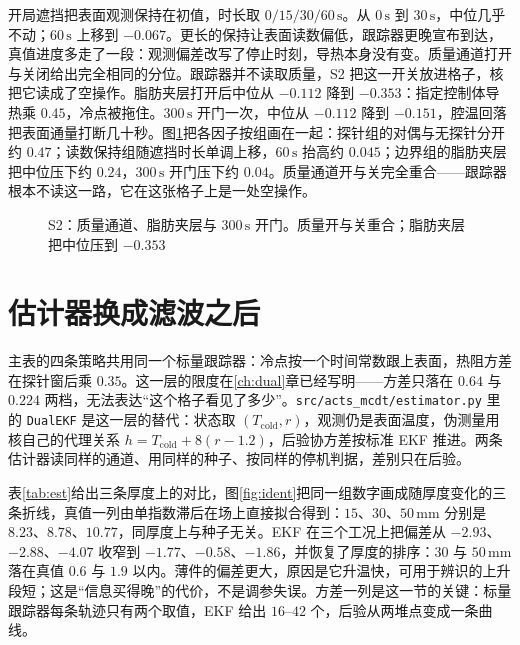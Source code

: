 开局遮挡把表面观测保持在初值，时长取 \(0/15/30/60\,\mathrm{s}\)。从 \(0\,\mathrm{s}\) 到 \(30\,\mathrm{s}\)，中位几乎不动；\(60\,\mathrm{s}\) 上移到 \(-0.067\)。更长的保持让表面读数偏低，跟踪器更晚宣布到达，真值进度多走了一段：观测偏差改写了停止时刻，导热本身没有变。质量通道打开与关闭给出完全相同的分位。跟踪器并不读取质量，S2 把这一开关放进格子，核把它读成了空操作。脂肪夹层打开后中位从 \(-0.112\) 降到 \(-0.353\)：指定控制体导热乘 \(0.45\)，冷点被拖住。\(300\,\mathrm{s}\) 开门一次，中位从 \(-0.112\) 降到 \(-0.151\)，腔温回落把表面通量打断几十秒。图\ref{fig:s2three}{}把各因子按组画在一起：探针组的对偶与无探针分开约 \(0.47\)；读数保持组随遮挡时长单调上移，\(60\,\mathrm{s}\) 抬高约 \(0.045\)；边界组的脂肪夹层把中位压下约 \(0.24\)，\(300\,\mathrm{s}\) 开门压下约 \(0.04\)。质量通道开与关完全重合——跟踪器根本不读这一路，它在这张格子上是一处空操作。

\begin{figure}[t]
\centering
{}
\caption{S2：质量通道、脂肪夹层与 \(300\,\mathrm{s}\) 开门。质量开与关重合；脂肪夹层把中位压到 \(-0.353\)}
\label{fig:s2three}
\end{figure}

\section{估计器换成滤波之后}
\label{ch:estcompare}
主表的四条策略共用同一个标量跟踪器：冷点按一个时间常数跟上表面，热阻方差在探针窗后乘 \(0.35\)。这一层的限度在\ref{ch:dual}{}章已经写明——方差只落在 \(0.64\) 与 \(0.224\) 两档，无法表达“这个格子看见了多少”。\texttt{src/acts\_mcdt/estimator.py} 里的 \texttt{DualEKF} 是这一层的替代：状态取 \((T_{\mathrm{cold}},r)\)，观测仍是表面温度，伪测量用核自己的代理关系 \(h=T_{\mathrm{cold}}+8(r-1.2)\)，后验协方差按标准 EKF 推进。两条估计器读同样的通道、用同样的种子、按同样的停机判据，差别只在后验。

表\ref{tab:est}{}给出三条厚度上的对比，图\ref{fig:ident}{}把同一组数字画成随厚度变化的三条折线，真值一列由单指数滞后在场上直接拟合得到：\(15\)、\(30\)、\(50\,\mathrm{mm}\) 分别是 \(8.23\)、\(8.78\)、\(10.77\)，同厚度上与种子无关。EKF 在三个工况上把偏差从 \(-2.93\)、\(-2.88\)、\(-4.07\) 收窄到 \(-1.77\)、\(-0.58\)、\(-1.86\)，并恢复了厚度的排序：\(30\) 与 \(50\,\mathrm{mm}\) 落在真值 \(0.6\) 与 \(1.9\) 以内。薄件的偏差更大，原因是它升温快，可用于辨识的上升段短；这是“信息买得晚”的代价，不是调参失误。方差一列是这一节的关键：标量跟踪器每条轨迹只有两个取值，EKF 给出 \(16\)--\(42\) 个，后验从两堆点变成一条曲线。


